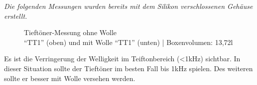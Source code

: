 \textit{Die folgenden Messungen wurden bereits mit dem Silikon verschlossenen Gehäuse erstellt.}\\
\begin{figure} [H]
	\centering
	\quad
	\caption{Tieftöner-Messung ohne Wolle\\ \enquote{TT1} (oben) und mit Wolle \enquote{TT1} (unten) | Boxenvolumen: 13,72l}
	\label{fig:4.2.4.1}
\end{figure}
Es ist die Verringerung der Welligkeit im Teiftonbereich (<1kHz) sichtbar.
In dieser Situation sollte der Tieftöner im besten Fall bis 1kHz spielen.
Des weiteren sollte er besser mit Wolle versehen werden.

